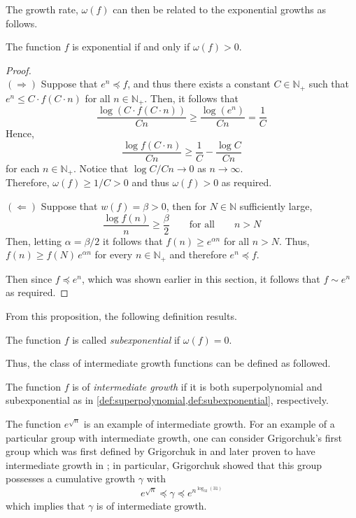 The growth rate, $\omega(f)$ can then be related to the exponential growths as follows.

\begin{proposition}
	The function $f$ is exponential if and only if $\omega(f) > 0$.
\end{proposition}

\begin{proof}
	\ \\
	$(\Longrightarrow)$
	Suppose that $e^n \preccurlyeq f$, and thus there exists a constant $C \in \mathbb{N}_+$ such that $e^n \leq C \cdot f(C\cdot n)$ for all $n \in \mathbb{N}_+$.
	Then, it follows that
	\[
	  \frac{\log\left( C \cdot f(C \cdot n) \right)}{C n}
	  \geq
	  \frac{\log \left(e^n\right)}{Cn}
	  =
	  \frac{1}{C}
	\]
	Hence,
	\[
	  \frac{\log f(C \cdot n) }{Cn}
	  \geq
	  \frac{1}{C}
	  - \frac{\log C}{Cn}
	\]
	for each $n \in \mathbb{N}_+$.
	Notice that $\log C / Cn \to 0$ as $n \to \infty$.\\
	Therefore, $\omega(f) \geq 1/C > 0$ and thus $\omega(f)>0$ as required.
	
	$(\Longleftarrow)$
	Suppose that $w(f) = \beta > 0$, then for $N \in \mathbb{N}$ sufficiently large,
	\[
	  \frac{\log f(n)}{n}
	  \geq
	  \frac{\beta}{2}
	  \qquad
	  \text{for all}
	  \qquad
	  n > N
	\]
	Then, letting $\alpha = \beta/2$ it follows that $f(n) \geq e^{\alpha n} $ for all $n > N$.
	Thus, $f(n) \geq f(N) \, e^{\alpha n}$ for every $n \in \mathbb{N}_+$ and therefore $e^n \preccurlyeq f$.
	
	Then since $f \preccurlyeq e^n$, which was shown earlier in this section, it follows that $f \sim e^n$ as required.
\end{proof}

From this proposition, the following definition results.

\begin{definition}
	\label{def:subexponential}
	The function $f$ is called \emph{subexponential} if $\omega(f) = 0$.
	\thmendmark
\end{definition}

Thus, the class of intermediate growth functions can be defined as followed.

\begin{definition}
	The function $f$ is of \emph{intermediate growth} if it is both superpolynomial and subexponential as in \cref{def:superpolynomial,def:subexponential}, respectively.
\end{definition}

\begin{example}
	The function $e^{\sqrt{n}}$ is an example of intermediate growth.
	For an example of a particular group with intermediate growth, one can consider Grigorchuk's first group which was first defined by Grigorchuk in \cite{GrigFirst} and later proven to have intermediate growth in \cite{GrigInterm};
	in particular, Grigorchuk showed that this group possesses a cumulative growth $\gamma$ with
	\[
	  e^{\displaystyle \sqrt{n}}
	  \preccurlyeq
	  \gamma
	  \preccurlyeq
	  e^{\displaystyle n^{\log_{32} (31) }}
	\]
	which implies that $\gamma$ is of intermediate growth.
\end{example}


